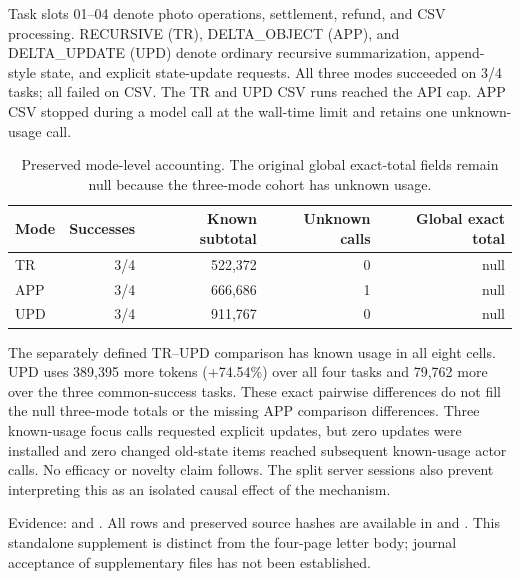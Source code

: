 \documentclass[a4paper,10pt]{article}
\begin{document}
\noindent
Task slots 01--04 denote photo operations, settlement, refund, and CSV processing.
RECURSIVE (TR), DELTA\_OBJECT (APP), and DELTA\_UPDATE (UPD) denote ordinary
recursive summarization, append-style state, and explicit state-update requests.
All three modes succeeded on 3/4 tasks; all failed on CSV. The TR and UPD CSV
runs reached the API cap. APP CSV stopped during a model call at the wall-time
limit and retains one unknown-usage call.

\begin{table}[ht]
\centering
\caption{Preserved mode-level accounting. The original global exact-total
fields remain null because the three-mode cohort has unknown usage.}
\begin{tabular}{@{}lrrrr@{}}
\toprule
Mode & Successes & Known subtotal & Unknown calls & Global exact total\\
\midrule
TR & 3/4 & 522,372 & 0 & null\\
APP & 3/4 & 666,686 & 1 & null\\
UPD & 3/4 & 911,767 & 0 & null\\
\bottomrule
\end{tabular}
\end{table}

\noindent
The separately defined TR--UPD comparison has known usage in all eight cells.
UPD uses 389,395 more tokens (+74.54\%) over all four tasks and 79,762 more over
the three common-success tasks. These exact pairwise differences do not fill
the null three-mode totals or the missing APP comparison differences.
Three known-usage focus calls requested explicit updates, but zero updates
were installed and zero changed old-state items reached subsequent known-usage
actor calls. No efficacy or novelty claim follows. The split server sessions
also prevent interpreting this as an isolated causal effect of the mechanism.

\medskip\noindent\footnotesize
Evidence:  and
.
All rows and preserved source hashes are available in
 and .
This standalone supplement is distinct from the four-page letter body;
journal acceptance of supplementary files has not been established.
\end{document}
